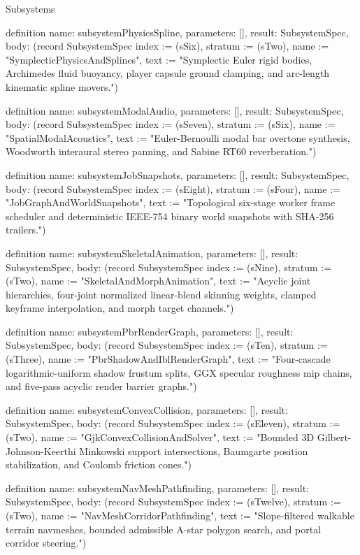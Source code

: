 \begin{lexlean}{Subsystems}
\begin{semanticmodule}
definition{
  name: subsystemPhysicsSpline,
  parameters: [],
  result: SubsystemSpec,
  body: (record SubsystemSpec {index := (sSix), stratum := (sTwo), name := "SymplecticPhysicsAndSplines", text := "Symplectic Euler rigid bodies, Archimedes fluid buoyancy, player capsule ground clamping, and arc-length kinematic spline movers."})
}

definition{
  name: subsystemModalAudio,
  parameters: [],
  result: SubsystemSpec,
  body: (record SubsystemSpec {index := (sSeven), stratum := (sSix), name := "SpatialModalAcoustics", text := "Euler-Bernoulli modal bar overtone synthesis, Woodworth interaural stereo panning, and Sabine RT60 reverberation."})
}

definition{
  name: subsystemJobSnapshots,
  parameters: [],
  result: SubsystemSpec,
  body: (record SubsystemSpec {index := (sEight), stratum := (sFour), name := "JobGraphAndWorldSnapshots", text := "Topological six-stage worker frame scheduler and deterministic IEEE-754 binary world snapshots with SHA-256 trailers."})
}

definition{
  name: subsystemSkeletalAnimation,
  parameters: [],
  result: SubsystemSpec,
  body: (record SubsystemSpec {index := (sNine), stratum := (sTwo), name := "SkeletalAndMorphAnimation", text := "Acyclic joint hierarchies, four-joint normalized linear-blend skinning weights, clamped keyframe interpolation, and morph target channels."})
}

definition{
  name: subsystemPbrRenderGraph,
  parameters: [],
  result: SubsystemSpec,
  body: (record SubsystemSpec {index := (sTen), stratum := (sThree), name := "PbrShadowAndIblRenderGraph", text := "Four-cascade logarithmic-uniform shadow frustum splits, GGX specular roughness mip chains, and five-pass acyclic render barrier graphs."})
}

definition{
  name: subsystemConvexCollision,
  parameters: [],
  result: SubsystemSpec,
  body: (record SubsystemSpec {index := (sEleven), stratum := (sTwo), name := "GjkConvexCollisionAndSolver", text := "Bounded 3D Gilbert-Johnson-Keerthi Minkowski support intersections, Baumgarte position stabilization, and Coulomb friction cones."})
}

definition{
  name: subsystemNavMeshPathfinding,
  parameters: [],
  result: SubsystemSpec,
  body: (record SubsystemSpec {index := (sTwelve), stratum := (sTwo), name := "NavMeshCorridorPathfinding", text := "Slope-filtered walkable terrain navmeshes, bounded admissible A-star polygon search, and portal corridor steering."})
}


\end{semanticmodule}
\end{lexlean}
